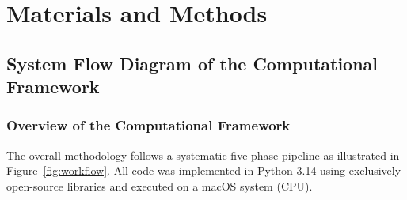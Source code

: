 \chapter{Materials and Methods}

\section{System Flow Diagram of the Computational Framework}

\subsection{Overview of the Computational Framework}

The overall methodology follows a systematic five-phase pipeline as illustrated in
Figure~\ref{fig:workflow}. All code was implemented in Python 3.14 using
exclusively open-source libraries and executed on a macOS system (CPU).

